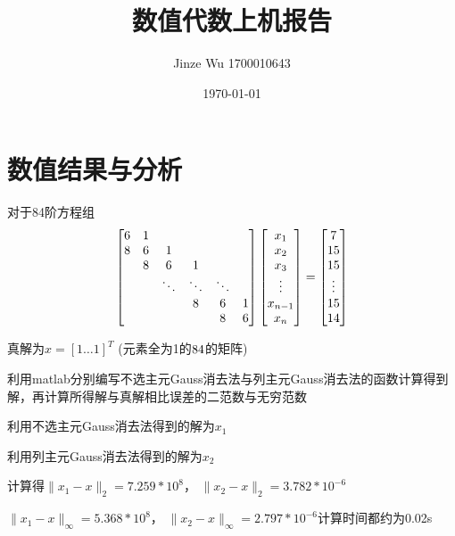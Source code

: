 \documentclass[withoutpreface,bwprint]{cumcmthesis}
\title{数值代数上机报告}
\date{\today}
\author{Jinze Wu 1700010643}
\begin{document}
\maketitle
\section{数值结果与分析}
对于84阶方程组
\begin{equation}
\begin{bmatrix}
   6 & 1 &       &         &        &   \\
   8 &  6 & 1     &      &        &   \\
     & 8 & 6     &  1       &        &    \\
     &    &\ddots   & \ddots    & \ddots   &      \\
     &   &      &   8      &  6      &   1  \\   
     &    &       &          &   8      &   6  \\   
\end{bmatrix}
\begin{bmatrix}
$$x_{1}$$\\
$$x_{2}$$\\
$$x_{3}$$\\
$$\vdots$$\\
$$x_{n-1}$$\\
$$x_{n}$$\\
\end{bmatrix}
=
\begin{bmatrix}
7\\
15\\
15\\
\vdots\\
15\\
14\\
\end{bmatrix}
\end{equation}

真解为$x=[1 \dots 1 ]^{T}$ (元素全为1的$84\time1$的矩阵)

利用matlab分别编写不选主元Gauss消去法与列主元Gauss消去法的函数计算得到解，再计算所得解与真解相比误差的二范数与无穷范数

利用不选主元Gauss消去法得到的解为$x_{1}$

利用列主元Gauss消去法得到的解为$x_{2}$

计算得$\lVert x_{1}-x \rVert_{2}= 7.259*10^{8}$， $\lVert x_{2}-x \rVert_{2}=3.782*10^{-6}$

$\lVert x_{1}-x \rVert_{\infty}=5.368*10^{8}$， $\lVert x_{2}-x \rVert_{\infty}=2.797*10^{-6}$计算时间都约为0.02s
\end{document}

